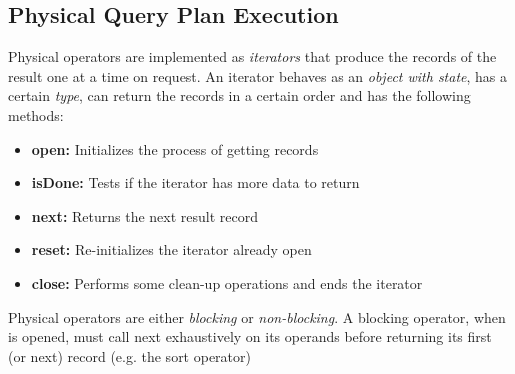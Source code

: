 \subsection{Physical Query Plan Execution}
Physical operators are implemented as \textit{iterators} that produce the records of the result one at a time on request. An iterator behaves as an \textit{object with state}, has a certain \textit{type}, can return the records in a certain order and has the following methods:
\begin{itemize}
    \item \textbf{open:} Initializes the process of getting records
    \item \textbf{isDone:} Tests if the iterator has more data to return
    \item \textbf{next:} Returns the next result record
    \item \textbf{reset:} Re-initializes the iterator already open
    \item \textbf{close:} Performs some clean-up operations and ends the iterator
\end{itemize}

Physical operators are either \textit{blocking} or \textit{non-blocking}. A blocking operator, when is opened, must call next exhaustively on its operands before returning its first (or next) record (e.g. the sort operator)

